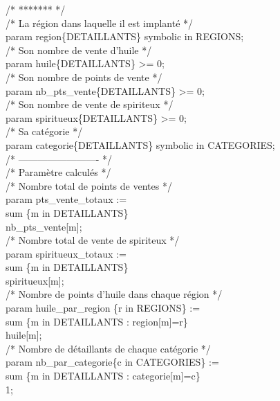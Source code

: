 \documentclass[a4paper,12pt,oneside]{report}
\begin{document}
/* ******* */\\
/* La région dans laquelle il est implanté */\\
param region\{DETAILLANTS\} symbolic in REGIONS;\\

/* Son nombre de vente d'huile */\\
param huile\{DETAILLANTS\} >= 0;\\

/* Son nombre de points de vente */\\
param nb\_pts\_vente\{DETAILLANTS\} >= 0;\\

/* Son nombre de vente de spiriteux */\\
param spiritueux\{DETAILLANTS\} >= 0;\\

/* Sa catégorie */\\
param categorie\{DETAILLANTS\} symbolic in CATEGORIES;\\

/* ------------------------- */\\
/* Paramètre calculés */\\

/* Nombre total de points de ventes */\\
param pts\_vente\_totaux :=\\
	sum \{m in DETAILLANTS\}\\
	nb\_pts\_vente[m];\\

/* Nombre total de vente de spiriteux */\\
param spiritueux\_totaux :=\\
	sum \{m in DETAILLANTS\}\\
	spiritueux[m];\\

/* Nombre de points d'huile dans chaque région */\\
param huile\_par\_region \{r in REGIONS\} :=\\
	sum \{m in DETAILLANTS : region[m]=r\}\\
	huile[m];\\

/* Nombre de détaillants de chaque catégorie */\\
param nb\_par\_categorie\{c in CATEGORIES\} :=\\
	sum \{m in DETAILLANTS : categorie[m]=c\}\\
	1;\\
\end{document}
